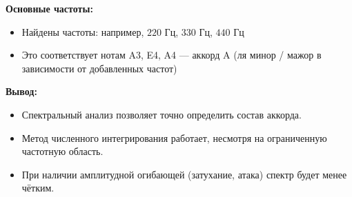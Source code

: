 \textbf{Основные частоты:}

\begin{itemize}
    \item Найдены частоты: например, $220$ Гц, $330$ Гц, $440$ Гц
    \item Это соответствует нотам A3, E4, A4 — аккорд A (ля минор / мажор в зависимости от добавленных частот)
\end{itemize}

\textbf{Вывод:}

\begin{itemize}
    \item Спектральный анализ позволяет точно определить состав аккорда.
    \item Метод численного интегрирования работает, несмотря на ограниченную частотную область.
    \item При наличии амплитудной огибающей (затухание, атака) спектр будет менее чётким.
\end{itemize}


